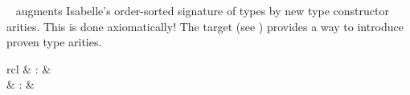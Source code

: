\begin{isabellebody}
\begin{isamarkuptext}
\begin{description}
  \item \hyperlink{command.arities}{\mbox{}}~ augments
  Isabelle's order-sorted signature of types by new type constructor
  arities.  This is done axiomatically!  The \hyperlink{command.instantiation}{\mbox{}}
  target (see ) provides a way to introduce
  proven type arities.

  \end{description}%
\end{isamarkuptext}%
\isamarkuptrue%
%
\isamarkuptrue%
%
\begin{isamarkuptext}%
\begin{matharray}{rcl}
    \hypertarget{command.consts}{\hyperlink{command.consts}{\mbox{}}} & : &  \\
    \hypertarget{command.defs}{\hyperlink{command.defs}{\mbox{}}} & : &  \\
  \end{matharray}


\end{isamarkuptext}
\end{isabellebody}
